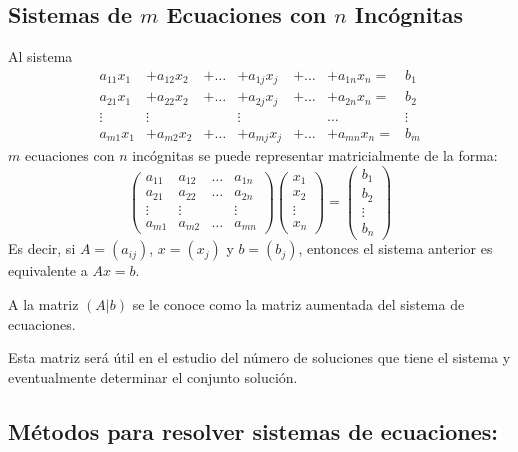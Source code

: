 \subsection{Sistemas de $m$ Ecuaciones con $n$ Incógnitas}
Al sistema 
\[\begin{array}{ccccccc}\label{nsistema}
        a_{11}x_1&+ a_{12} x_2&+ \dots &+ a_{1j}x_j &+ \dots &+ a_{1n}x_n=& b_1\\
     a_{21}x_1&+ a_{22} x_2&+ \dots &+ a_{2j} x_j&+\dots &+  a_{2n}x_n=& b_2\\
    \vdots & \vdots &  & \vdots  &  &\dots  & \vdots\\
     a_{m1}x_1&+ a_{m2} x_2&+ \dots&+  a_{mj}x_j&+ \dots&+  a_{mn}x_n=& b_m
\end{array}\]
$m$ ecuaciones con $n$ incógnitas se puede representar matricialmente de la forma:
\[\left(\begin{array}{cccc}
     a_{11}& a_{12} & \dots  & a_{1n}\\
     a_{21}& a_{22} & \dots & a_{2n}\\
     \vdots&  \vdots &    &  \vdots\\
     a_{m1}& a_{m2}  &\dots & a_{mn}
\end{array}\right) \left(\begin{array}{c}
   x_1 \\
   x_2 \\
   \vdots\\
   x_n 
\end{array}\right)= \left(\begin{array}{c}
   b_1 \\
   b_2 \\
   \vdots\\
   b_n 
\end{array}\right)\]
Es decir, si $A=(a_{ij})$, $x=(x_j)$ y $b=(b_j)$, entonces el sistema anterior es equivalente a $Ax=b$.

\begin{defin}
A la matriz $(A|b)$ se le conoce como la matriz aumentada del sistema de ecuaciones.
\end{defin}
Esta matriz ser\'a \'util en el estudio del n\'umero de soluciones que tiene el sistema y eventualmente determinar el conjunto soluci\'on.

\subsection{Métodos para resolver sistemas de ecuaciones:}

